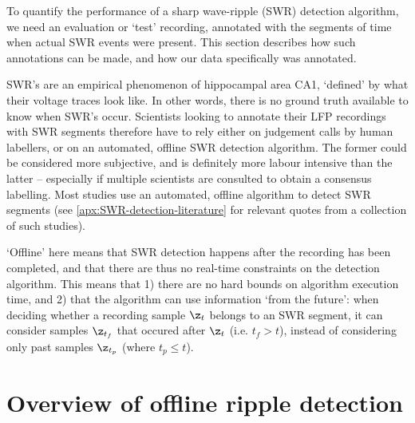 \label{ch:offline}

To quantify the performance of a sharp wave-ripple (SWR) detection algorithm, we need an evaluation or `test' recording, annotated with the segments of time when actual SWR events were present. This section describes how such annotations can be made, and how our data specifically was annotated.

SWR's are an empirical phenomenon of hippocampal area CA1, `defined' by what their voltage traces look like. In other words, there is no ground truth available to know when SWR's occur. Scientists looking to annotate their LFP recordings with SWR segments therefore have to rely either on judgement calls by human labellers, or on an automated, offline SWR detection algorithm. The former could be considered more subjective, and is definitely more labour intensive than the latter -- especially if multiple scientists are consulted to obtain a consensus labelling. Most studies use an automated, offline algorithm to detect SWR segments (see \cref{apx:SWR-detection-literature} for relevant quotes from a collection of such studies).

`Offline' here means that SWR detection happens after the recording has been completed, and that there are thus no real-time constraints on the detection algorithm. This means that 1) there are no hard bounds on algorithm execution time, and 2) that the algorithm can use information `from the future': when deciding whether a recording sample $\z_t$ belongs to an SWR segment, it can consider samples $\z_{t_f}$ that occured after $\z_t$ (i.e. $t_f > t$), instead of considering only past samples $\z_{t_p}$ (where $t_p \leq t$).


\begin{figure}
\label{fig:offline-steps}
\end{figure}    


\section{Overview of offline ripple detection}

